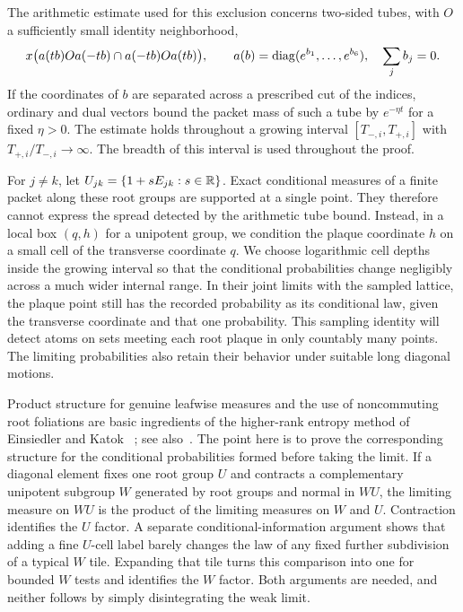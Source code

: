 The arithmetic estimate used for this exclusion concerns two-sided
tubes, with $O$ a sufficiently small identity neighborhood,
\[
 x\bigl(a(tb)Oa(-tb)\cap a(-tb)Oa(tb)\bigr),
 \qquad a(b)=\operatorname{diag}(e^{b_1},\ldots,e^{b_6}),\quad\sum_jb_j=0.
\]
If the coordinates of $b$ are separated across a prescribed cut of the
indices, ordinary and dual vectors bound the packet mass of such a
tube by $e^{-\eta t}$ for a fixed $\eta>0$. The estimate holds throughout a growing interval
$[T_{-,i},T_{+,i}]$ with $T_{+,i}/T_{-,i}\to\infty$.
The breadth of this interval is used throughout the proof.

For $j\ne k$, let $U_{jk}=\{1+sE_{jk}:s\in\mathbb R\}$.
Exact conditional measures of a finite packet along these root groups
are supported at a single point. They therefore cannot express the
spread detected by the arithmetic tube bound. Instead, in a local box
$(q,h)$ for a unipotent group, we condition the plaque coordinate $h$
on a small cell of the transverse coordinate $q$. We choose logarithmic
cell depths inside the growing interval so that the conditional
probabilities change negligibly across a much wider internal range.
In their joint limits with the sampled lattice, the plaque point still
has the recorded probability as its conditional law, given the transverse
coordinate and that one probability. This sampling identity will detect
atoms on sets meeting each root plaque in only countably many points.
The limiting probabilities also retain their behavior under suitable
long diagonal motions.

Product structure for genuine leafwise measures and the use of
noncommuting root foliations are basic ingredients of the higher-rank
entropy method of Einsiedler and Katok
\cite[Proposition~8.3]{EK2003}~\cite[Theorems~8.4--8.5]{EK2005};
see also~\cite[Corollary~8.8 and Theorem~9.8]{EL2010}. The point here is
to prove the corresponding structure for the conditional probabilities
formed before taking the limit. If a diagonal element fixes one root
group $U$ and contracts a complementary unipotent subgroup $W$ generated
by root groups and normal in $WU$,
the limiting measure on $WU$ is the product of the limiting measures
on $W$ and $U$. Contraction identifies the $U$ factor. A separate
conditional-information argument shows that adding a fine $U$-cell label
barely changes the law of any fixed further subdivision of a typical
$W$ tile. Expanding that tile turns this comparison into one for bounded
$W$ tests and identifies the $W$ factor. Both arguments are needed, and neither
follows by simply disintegrating the weak limit.

